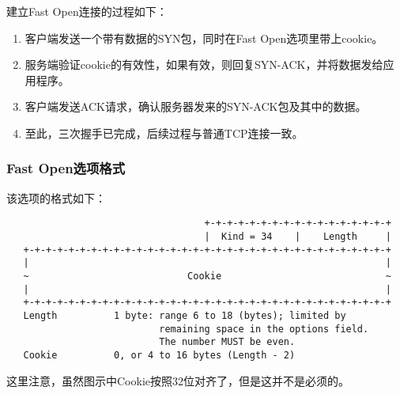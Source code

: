 建立Fast Open连接的过程如下：
\begin{enumerate}
  \item 客户端发送一个带有数据的SYN包，同时在Fast Open选项里带上cookie。
  \item 服务端验证cookie的有效性，如果有效，则回复SYN-ACK，并将数据发给应用程序。
  \item 客户端发送ACK请求，确认服务器发来的SYN-ACK包及其中的数据。
  \item 至此，三次握手已完成，后续过程与普通TCP连接一致。
\end{enumerate}

\subsubsection{Fast Open选项格式}
\label{subsubsec:fast-open-option}
该选项的格式如下：
\begin{verbatim}
                                   +-+-+-+-+-+-+-+-+-+-+-+-+-+-+-+-+
                                   |  Kind = 34    |    Length     |
   +-+-+-+-+-+-+-+-+-+-+-+-+-+-+-+-+-+-+-+-+-+-+-+-+-+-+-+-+-+-+-+-+
   |                                                               |
   ~                            Cookie                             ~
   |                                                               |
   +-+-+-+-+-+-+-+-+-+-+-+-+-+-+-+-+-+-+-+-+-+-+-+-+-+-+-+-+-+-+-+-+
   Length          1 byte: range 6 to 18 (bytes); limited by
                           remaining space in the options field.
                           The number MUST be even.
   Cookie          0, or 4 to 16 bytes (Length - 2)
\end{verbatim}
这里注意，虽然图示中Cookie按照32位对齐了，但是这并不是必须的。
